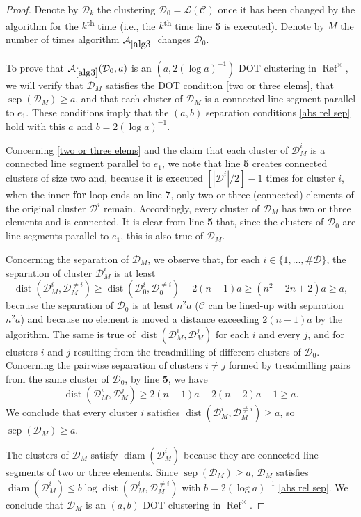 \documentclass[11pt,reqno]{amsart}
\theoremstyle{definition}
\numberwithin{equation}{section}
\newcommand{\1}{\mathbf{1}}
\DeclareMathOperator{\dist}{dist}
\DeclareMathOperator{\diam}{diam}
\DeclareMathOperator{\sep}{sep}
\DeclareMathOperator{\Refcon}{\mathrm{Ref}}
\newcommand{\CC}{\mathcal{C}}
\newcommand{\DD}{\mathcal{D}}
\begin{document}
\begin{proof}
Denote by $\DD_k$ the clustering $\DD_0 = \mathcal{L}(\CC)$ once it has been changed by the algorithm for the $k$\textsuperscript{th} time (i.e., the $k$\textsuperscript{th} time line {\bf 5} is executed). Denote by $M$ the number of times algorithm $\mathcal{A}_{\ref{alg3}}$ changes $\DD_0$.

To prove that $\mathcal{A}_{\ref{alg3}} (\DD_0,a)$ is an $(a,2(\log a)^{-1})$ DOT clustering in $\Refcon^\times$, we will verify that $\DD_M$ satisfies the DOT condition \eqref{two or three elems}, that $\sep (\DD_M) \geq a$, and that each cluster of $\DD_M$ is a connected line segment parallel to $e_1$. These conditions imply that the $(a,b)$ separation conditions \eqref{abs rel sep} hold with this $a$ and $b = 2(\log a)^{-1}$.

Concerning \eqref{two or three elems} and the claim that each cluster of $\DD_M^i$ is a connected line segment parallel to $e_1$, we note that line {\bf 5} creates connected clusters of size two and, because it is executed $[ |\DD^i|/2 ] - 1$ times for cluster $i$, when the inner {\bf for} loop ends on line {\bf 7}, only two or three (connected) elements of the original cluster $\DD^i$ remain. Accordingly, every cluster of $\DD_M$ has two or three elements and is connected. It is clear from line {\bf 5} that, since the clusters of $\DD_0$ are line segments parallel to $e_1$, this is also true of $\DD_M$.

Concerning the separation of $\DD_M$, we observe that, for each $i \in \{1,\dots,\# \DD\}$, the separation of cluster $\DD_M^i$ is at least
\[\dist (\DD_M^i, \DD_M^{\neq i}) \geq \dist (\DD_0^i,\DD_0^{\neq i}) - 2(n-1)a \geq (n^2 - 2n + 2)a \geq a,\]
because the separation of $\DD_0$ is at least $n^2 a$ ($\CC$ can be lined-up with separation $n^2 a$) and because no element is moved a distance exceeding $2(n-1) a$ by the algorithm. The same is true of $\dist (\DD_M^i, \DD_M^j)$ for each $i$ and every $j$, and for clusters $i$ and $j$ resulting from the treadmilling of different clusters of $\DD_0$. Concerning the pairwise separation of clusters $i \neq j$ formed by treadmilling pairs from the same cluster of $\DD_0$, by line {\bf 5}, we have
\[ \dist (\DD_M^i, \DD_M^j) \geq 2(n-1)a - 2(n-2)a - 1 \geq a.\] We conclude that every cluster $i$ satisfies $\dist (\DD_M^i, \DD_M^{\neq i}) \geq a$, so $\sep (\DD_M) \geq a$.

The clusters of $\DD_M$ satisfy $\diam (\DD_M^i)$ because they are connected line segments of two or three elements. Since $\sep (\DD_M) \geq a$, $\DD_M$ satisfies $\diam (\DD_M^i) \leq b \log \dist(\DD_M^i, \DD_M^{\neq i})$ with $b = 2 (\log a)^{-1}$ \eqref{abs rel sep}. We conclude that $\DD_M$ is an $(a,b)$ DOT clustering in $\Refcon^\times$.
\end{proof}
\end{document}
